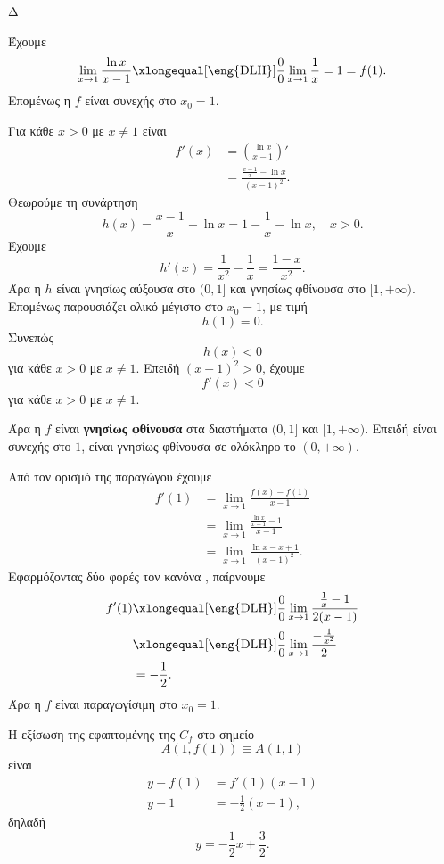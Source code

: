 \begin{thema}{Δ}
\begin{erwthma}
\item Έχουμε
\[
\lim_{x\to1}\frac{\ln x}{x-1}
\xlongequal[\text{\eng{DLH}}]{\frac{0}{0}}
\lim_{x\to1}\frac{1}{x}
=1=f(1).
\]
Επομένως η $f$ είναι συνεχής στο $x_0=1$.

Για κάθε $x>0$ με $x\neq1$ είναι
\begin{align*}
f'(x)
&=\left(\frac{\ln x}{x-1}\right)'\\
&=\frac{\frac{x-1}{x}-\ln x}{(x-1)^2}.
\end{align*}
Θεωρούμε τη συνάρτηση
\[
h(x)=\frac{x-1}{x}-\ln x
=1-\frac{1}{x}-\ln x,\quad x>0.
\]
Έχουμε
\[
h'(x)=\frac{1}{x^2}-\frac{1}{x}
=\frac{1-x}{x^2}.
\]
Άρα η $h$ είναι γνησίως αύξουσα στο $(0,1]$ και γνησίως φθίνουσα στο $[1,+\infty)$. Επομένως παρουσιάζει ολικό μέγιστο στο $x_0=1$, με τιμή
\[
h(1)=0.
\]
Συνεπώς
\[
h(x)<0
\]
για κάθε $x>0$ με $x\neq1$. Επειδή $(x-1)^2>0$, έχουμε
\[
f'(x)<0
\]
για κάθε $x>0$ με $x\neq1$.

Άρα η $f$ είναι \textbf{γνησίως φθίνουσα} στα διαστήματα $(0,1]$ και $[1,+\infty)$. Επειδή είναι συνεχής στο $1$, είναι γνησίως φθίνουσα σε ολόκληρο το $(0,+\infty)$.

\item Από τον ορισμό της παραγώγου έχουμε
\begin{align*}
f'(1)
&=\lim_{x\to1}\frac{f(x)-f(1)}{x-1}\\
&=\lim_{x\to1}
\frac{\frac{\ln x}{x-1}-1}{x-1}\\
&=\lim_{x\to1}
\frac{\ln x-x+1}{(x-1)^2}.
\end{align*}
Εφαρμόζοντας δύο φορές τον κανόνα , παίρνουμε
\begin{align*}
f'(1)
&\xlongequal[\text{\eng{DLH}}]{\frac{0}{0}}
\lim_{x\to1}\frac{\frac{1}{x}-1}{2(x-1)}\\
&\xlongequal[\text{\eng{DLH}}]{\frac{0}{0}}
\lim_{x\to1}\frac{-\frac{1}{x^2}}{2}\\
&={-\frac{1}{2}}.
\end{align*}
Άρα η $f$ είναι παραγωγίσιμη στο $x_0=1$.

Η εξίσωση της εφαπτομένης της $C_f$ στο σημείο
\[
A(1,f(1))\equiv A(1,1)
\]
είναι
\begin{align*}
y-f(1)&=f'(1)(x-1)\\
y-1&=-\frac{1}{2}(x-1),
\end{align*}
δηλαδή
\[
{y=-\frac{1}{2}x+\frac{3}{2}}.
\]


\end{erwthma}
\end{thema}
